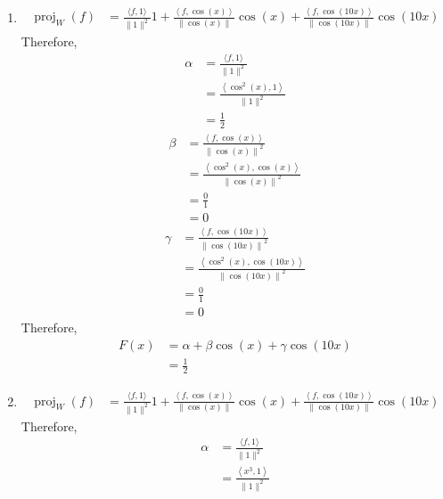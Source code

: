 \documentclass[fleqn, a4paper, 11pt, oneside]{amsart}
\theoremstyle{definition}
\theoremstyle{theorem}
\DeclareMathOperator{\proj}{proj}
\begin{document}
\begin{solution}
	\begin{enumerate}
		\item
			\begin{align*}
				\proj_{W}(f) &= \frac{\langle f,1 \rangle}{\|1\|^2} 1 + \frac{\left\langle f,\cos(x) \right\rangle}{\left\| \cos(x) \right\|} \cos(x) + \frac{\left\langle f,\cos(10 x) \right\rangle}{\left\| \cos(10 x) \right\|} \cos(10 x)
			\end{align*}
			Therefore,
			\begin{align*}
				\alpha &= \frac{\langle f,1 \rangle}{\|1\|^2}\\
				&= \frac{\left\langle \cos^2(x),1 \right\rangle}{\|1\|^2}\\
				&= \frac{1}{2}
			\end{align*}
			\begin{align*}
				\beta &= \frac{\left\langle f,\cos(x) \right\rangle}{\left\| \cos(x) \right\|^2}\\
				&= \frac{\left\langle \cos^2(x),\cos(x) \right\rangle}{\left\| \cos(x) \right\|^2}\\
				&= \frac{0}{1}\\
				&= 0
			\end{align*}
			\begin{align*}
				\gamma &= \frac{\left\langle f,\cos(10 x) \right\rangle}{\left\| \cos(10 x) \right\|^2}\\
				&= \frac{\left\langle \cos^2(x),\cos(10 x) \right\rangle}{\left\| \cos(10 x) \right\|^2}\\
				&= \frac{0}{1}\\
				&= 0
			\end{align*}
			Therefore,
			\begin{align*}
				F(x) &= \alpha + \beta \cos(x) + \gamma \cos(10 x)\\
				&= \frac{1}{2}
			\end{align*}
		\item
			\begin{align*}
				\proj_{W}(f) &= \frac{\langle f,1 \rangle}{\|1\|^2} 1 + \frac{\left\langle f,\cos(x) \right\rangle}{\left\| \cos(x) \right\|} \cos(x) + \frac{\left\langle f,\cos(10 x) \right\rangle}{\left\| \cos(10 x) \right\|} \cos(10 x)
			\end{align*}
			Therefore,
			\begin{align*}
				\alpha &= \frac{\langle f,1 \rangle}{\|1\|^2}\\
				&= \frac{\left\langle x^3,1 \right\rangle}{\|1\|^2}\\

\end{align*}
\end{enumerate}
\end{solution}
\end{document}
